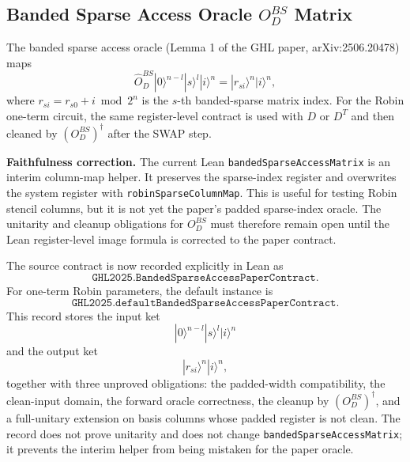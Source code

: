 \subsection{Banded Sparse Access Oracle $O_D^{BS}$ Matrix}

The banded sparse access oracle (Lemma 1 of the GHL paper,
arXiv:2506.20478) maps
\[
  \hat O_D^{BS}|0\rangle^{n-l}|s\rangle^l|i\rangle^n
  =
  |r_{si}\rangle^n|i\rangle^n,
\]
where $r_{si}=r_{s0}+i \bmod 2^n$ is the $s$-th banded-sparse matrix index.
For the Robin one-term circuit, the same register-level contract is used with
$D$ or $D^T$ and then cleaned by $(O_D^{BS})^\dagger$ after the SWAP step.

\textbf{Faithfulness correction.}  The current Lean
\texttt{bandedSparseAccessMatrix} is an interim column-map helper.  It preserves
the sparse-index register and overwrites the system register with
\texttt{robinSparseColumnMap}.  This is useful for testing Robin stencil
columns, but it is not yet the paper's padded sparse-index oracle.  The
unitarity and cleanup obligations for $O_D^{BS}$ must therefore remain open
until the Lean register-level image formula is corrected to the paper contract.

The source contract is now recorded explicitly in Lean as
\[
  \texttt{GHL2025.BandedSparseAccessPaperContract}.
\]
For one-term Robin parameters, the default instance is
\[
  \texttt{GHL2025.defaultBandedSparseAccessPaperContract}.
\]
This record stores the input ket
\[
  |0\rangle^{n-l}|s\rangle^l|i\rangle^n
\]
and the output ket
\[
  |r_{si}\rangle^n|i\rangle^n,
\]
together with three unproved obligations: the padded-width compatibility,
the clean-input domain, the forward oracle correctness, the cleanup by
$(O_D^{BS})^\dagger$, and a full-unitary extension on basis columns whose
padded register is not clean.  The record does not prove unitarity and does not change
\texttt{bandedSparseAccessMatrix}; it prevents the interim helper from being
mistaken for the paper oracle.

